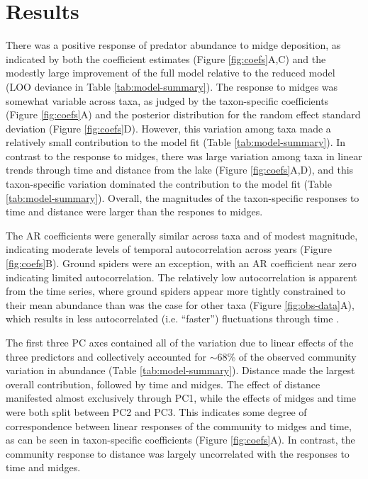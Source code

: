 

\section*{Results}

There was a positive response of predator abundance to midge deposition,
as indicated by both the coefficient estimates (Figure \ref{fig:coefs}A,C)
and the modestly large improvement of the full model
relative to the reduced model (LOO deviance in Table \ref{tab:model-summary}).
The response to midges was somewhat variable across taxa,
as judged by the taxon-specific coefficients (Figure \ref{fig:coefs}A)
and the posterior distribution
for the random effect standard deviation (Figure \ref{fig:coefs}D).
However, this variation among taxa made a relatively small contribution
to the model fit (Table \ref{tab:model-summary}).
In contrast to the response to midges, there was large variation among taxa in
linear trends through time and distance from the lake (Figure \ref{fig:coefs}A,D),
and this taxon-specific variation dominated the contribution to the model fit
(Table \ref{tab:model-summary}).
Overall, the magnitudes of the taxon-specific responses to time and distance
were larger than the respones to midges.



The AR coefficients were generally similar across taxa and of modest magnitude,
indicating moderate levels of temporal autocorrelation across years
(Figure \ref{fig:coefs}B).
Ground spiders were an exception,
with an AR coefficient near zero indicating limited autocorrelation.
The relatively low autocorrelation is apparent from the time series,
where ground spiders appear more tightly constrained to their mean abundance
than was the case for other taxa (Figure \ref{fig:obs-data}A),
which results in less autocorrelated (i.e. ``faster'') fluctuations through time
\citep{Ziebarth2010}.



The first three PC axes contained all of the variation
due to linear effects of the three predictors and
collectively accounted for $\sim$68\% of the observed community variation
in abundance (Table \ref{tab:model-summary}).
Distance made the largest overall contribution,
followed by time and midges.
The effect of distance manifested almost exclusively through PC1,
while the effects of midges and time were both split between PC2 and PC3.
This indicates some degree of correspondence between linear responses of the community
to midges and time, as can be seen in taxon-specific coefficients
(Figure \ref{fig:coefs}A).
In contrast, the community response to distance
was largely uncorrelated with the responses to time and midges.



